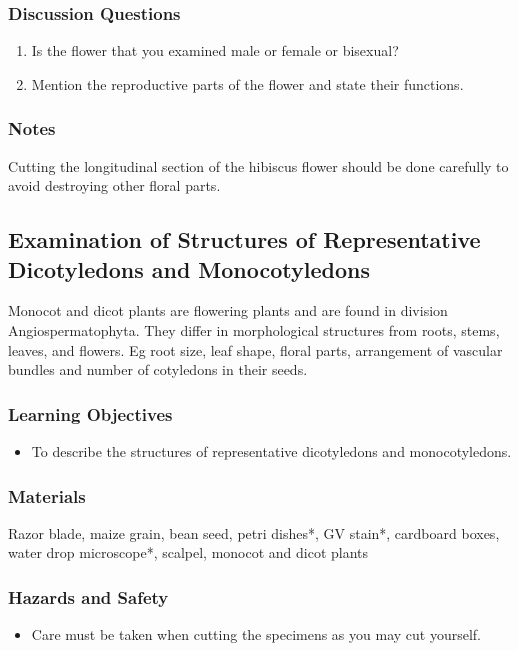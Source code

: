 \subsubsection*{Discussion Questions}
\begin{enumerate}
\item{Is the flower that you examined male or female or bisexual?}
\item{Mention the reproductive parts of the flower and state their functions.}
\end{enumerate}

\subsubsection*{Notes}
Cutting the longitudinal section of the hibiscus flower should be done carefully to avoid destroying other floral parts. 
 
\subsection{Examination of Structures of Representative Dicotyledons and Monocotyledons}
Monocot and dicot plants are flowering plants and are found in division Angiospermatophyta. They differ in morphological structures from roots, stems, leaves, and flowers. Eg root size, leaf shape, floral parts, arrangement of vascular bundles and number of cotyledons in their seeds.

\subsubsection*{Learning Objectives}
\begin{itemize}
\item{To describe the structures of representative dicotyledons and monocotyledons.}
\end{itemize}

\subsubsection*{Materials}
Razor blade, maize grain, bean seed, petri dishes*, GV stain*, cardboard boxes, water drop microscope*, scalpel, monocot and dicot plants

\subsubsection*{Hazards and Safety}
\begin{itemize}
\item{Care must be taken when cutting the specimens as you may cut yourself.}
\end{itemize}


